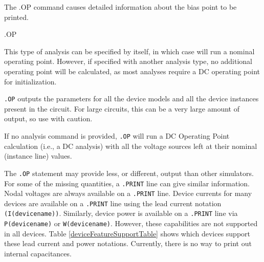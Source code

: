 


 
The .OP command causes detailed information about the bias point to be printed.

\begin{Command}\label{OP_COMMAND}

\format
.OP 

\comments

This type of analysis can be specified by itself, in which case \Xyce{}
will run a nominal operating point.  However, if specified with another
analysis type, no additional operating point will be calculated, as most
analyses require a DC operating point for initialization.

\texttt{.OP} outputs the parameters for all the device models
and all the device instances present in the circuit.  For large
circuits, this can be a very large amount of output, so use with
caution.

If no analysis command is provided, \texttt{.OP} will run a DC Operating
Point calculation (i.e., a DC analysis) with all the voltage sources 
left at their nominal (instance line) values.

The \Xyce{} \texttt{.OP} statement may provide less, or different, output than other simulators.  
For some of the missing quantities, a \Xyce{} \texttt{.PRINT} line can give similar information.  
Nodal voltages are always available  on a \texttt{.PRINT} line.  Device currents for many 
devices are available on a \texttt{.PRINT} line using the lead current notation 
\texttt{(I(devicename))}. Similarly, device power is available on a \texttt{.PRINT} line
via \texttt{P(devicename)} or \texttt{W(devicename)}.  However, these capabilities are not 
supported in all devices.  Table \ref{deviceFeatureSupportTable} shows which devices 
support these lead current and power notations.  Currently, there is no way to print 
out internal capacitances. 

\end{Command}

